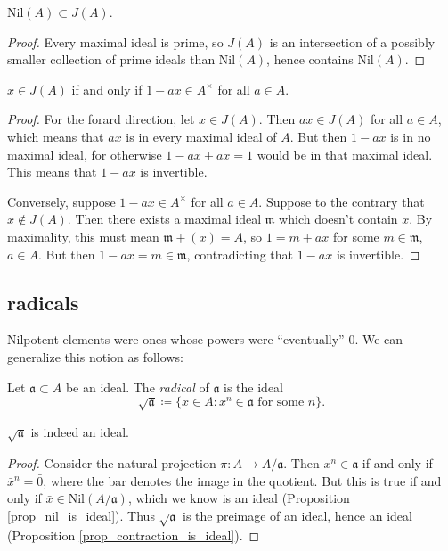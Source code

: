 \documentclass[12pt]{article}
\begin{document}
\begin{corollary}
	$\text{Nil}(A) \subset J(A)$.
\end{corollary}
\begin{proof}
	Every maximal ideal is prime, so $J(A)$ is an intersection of a possibly smaller collection of prime ideals than $\text{Nil}(A)$, hence contains $\text{Nil}(A)$.
\end{proof}

\begin{proposition}
\label{prop_x_in_ja_then_oneminusx_inv}
	$x\in J(A)$ if and only if $1-ax\in A^\times$ for all $a\in A$.
\end{proposition}
\begin{proof}
	For the forard direction, let $x\in J(A)$. Then $ax\in J(A)$ for all $a\in A$, which means that $ax$ is in every maximal ideal of $A$. But then $1-ax$ is in no maximal ideal, for otherwise $1-ax+ax=1$ would be in that maximal ideal. This means that $1-ax$ is invertible.

	Conversely, suppose $1-ax\in A^\times$ for all $a\in A$. Suppose to the contrary that $x\not\in J(A)$. Then there exists a maximal ideal $\mathfrak{m}$ which doesn't contain $x$. By maximality, this must mean $\mathfrak{m}+(x)=A$, so $1=m+ax$ for some $m\in\mathfrak{m}$, $a\in A$. But then $1-ax=m\in\mathfrak{m}$, contradicting that $1-ax$ is invertible.
\end{proof}


\subsection{radicals} %

Nilpotent elements were ones whose powers were ``eventually'' 0. We can generalize this notion as follows:

\begin{definition}
	Let $\mathfrak{a}\subset A$ be an ideal. The \emph{radical} of $\mathfrak{a}$ is the ideal 
	\begin{equation*}
		\sqrt{\mathfrak{a}} \coloneqq \{x\in A : x^n\in\mathfrak{a} \text{ for some } n \}.
	\end{equation*}
\end{definition}

\begin{corollary}
	$\sqrt{\mathfrak{a}}$ is indeed an ideal.
\end{corollary}
\begin{proof}
	Consider the natural projection $\pi:A\to A/\mathfrak{a}$. Then $x^n\in\mathfrak{a}$ if and only if $\bar{x}^n=\bar{0}$, where the bar denotes the image in the quotient. But this is true if and only if $\bar{x}\in\text{Nil}(A/\mathfrak{a})$, which we know is an ideal (Proposition \ref{prop_nil_is_ideal}). Thus $\sqrt{\mathfrak{a}}$ is the preimage of an ideal, hence an ideal (Proposition \ref{prop_contraction_is_ideal}). 
\end{proof}
\end{document}
